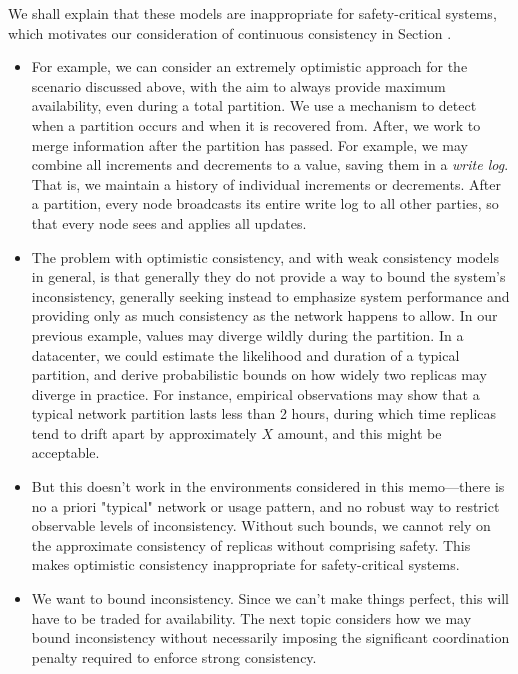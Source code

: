 We shall explain that these models are inappropriate for
safety-critical systems, which motivates our consideration of
continuous consistency in Section \cite{}.

\begin{itemize}
  \item For example, we can consider an extremely optimistic approach for
  the scenario discussed above, with the aim to always provide maximum
  availability, even during a total partition. We use a mechanism to
  detect when a partition occurs and when it is recovered from. After,
  we work to merge information after the partition has passed. For
  example, we may combine all increments and decrements to a value,
  saving them in a \emph{write log}. That is, we maintain a history of
  individual increments or decrements. After a partition, every node
  broadcasts its entire write log to all other parties, so that every
  node sees and applies all updates.

  \item The problem with optimistic consistency, and with weak consistency
  models in general, is that generally they do not provide a way to
  bound the system's inconsistency, generally seeking instead to
  emphasize system performance and providing only as much consistency
  as the network happens to allow. In our previous example, values may
  diverge wildly during the partition. In a datacenter, we could
  estimate the likelihood and duration of a typical partition, and
  derive probabilistic bounds on how widely two replicas may diverge
  in practice. For instance, empirical observations may show that a
  typical network partition lasts less than 2 hours, during which time
  replicas tend to drift apart by approximately $X$ amount, and this
  might be acceptable.

  \item But this doesn't work in the environments considered in this
  memo---there is no a priori "typical" network or usage pattern, and
  no robust way to restrict observable levels of
  inconsistency. Without such bounds, we cannot rely on the
  approximate consistency of replicas without comprising safety. This
  makes optimistic consistency inappropriate for safety-critical
  systems.

  \item We want to bound inconsistency. Since we can't make things perfect,
  this will have to be traded for availability. The next topic
  considers how we may bound inconsistency without necessarily
  imposing the significant coordination penalty required to enforce
  strong consistency.
  
\end{itemize}

